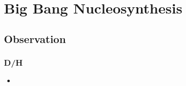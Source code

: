 \section{Big Bang Nucleosynthesis}
\subsection{Observation}
\subsubsection{D/H}
\begin{itemize}
\item \cite{pettini09a}
\end{itemize}
